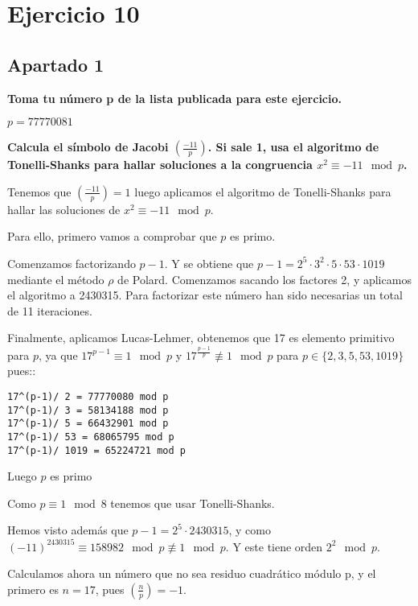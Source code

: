 \documentclass[a4paper]{article}
\title {\fbox{\Huge{\textbf{Ejercicio 10}}}}
\author {\fbox{Ana Buendía Ruiz-Azuaga}}
\begin{document}
\maketitle


\section{Ejercicio 10}

\subsection{Apartado 1}

\textbf{Toma tu número p de la lista publicada para este ejercicio.}

$p = 77770081$

\textbf{Calcula el símbolo de Jacobi $\left( \frac{-11}{p} \right)$. Si sale 1, usa el algoritmo de Tonelli-Shanks para hallar soluciones a la congruencia $x^2 \equiv -11 \mod p$.}

Tenemos que $\left( \frac{-11}{p}\right)=1$ luego aplicamos el algoritmo de Tonelli-Shanks para hallar las soluciones de $x^2\equiv -11\mod p$.

Para ello, primero vamos a comprobar que $p$ es primo.

Comenzamos factorizando $p-1$. Y se obtiene que $p-1=2^5\cdot 3^2\cdot 5 \cdot 53\cdot 1019$ mediante el método $\rho$ de Polard. Comenzamos sacando los factores 2, y aplicamos el algoritmo a 2430315. Para factorizar este número han sido necesarias un total de 11 iteraciones.

Finalmente, aplicamos Lucas-Lehmer, obtenemos que 17 es elemento primitivo para $p$, ya que $17^{p-1}\equiv 1\mod p$ y $17^{\frac{p-1}{p}}\not\equiv 1\mod p $ para $p\in\{2,3,5, 53, 1019\}$ pues::

\begin{verbatim}
17^(p-1)/ 2 = 77770080 mod p
17^(p-1)/ 3 = 58134188 mod p
17^(p-1)/ 5 = 66432901 mod p
17^(p-1)/ 53 = 68065795 mod p
17^(p-1)/ 1019 = 65224721 mod p
\end{verbatim}

Luego $p$ es primo

Como $p\equiv 1\mod 8$ tenemos que usar Tonelli-Shanks.

Hemos visto además que $p-1=2^5\cdot 2430315$, y  como $(-11)^{2430315} \equiv 158982 \mod p \not\equiv 1\mod p$.
Y este tiene orden $2^2 \mod p$.

Calculamos ahora un número que no sea residuo cuadrático módulo p, y el primero es $n=17$, pues $\left(\frac{n}{p}\right)=-1$.
\end{document}
